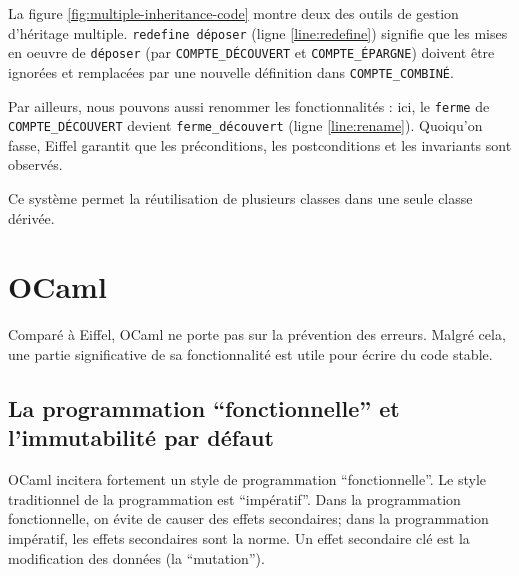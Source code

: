\documentclass[french]{report}
\begin{document}
La figure \ref{fig:multiple-inheritance-code} montre deux des outils de gestion d'héritage multiple. \texttt{redefine déposer} (ligne \ref{line:redefine}) signifie que les mises en oeuvre de \texttt{déposer} (par \texttt{COMPTE\_DÉCOUVERT} et \texttt{COMPTE\_ÉPARGNE}) doivent être ignorées et remplacées par une nouvelle définition dans \texttt{COMPTE\_COMBINÉ}.

Par ailleurs, nous pouvons aussi renommer les fonctionnalités : ici, le \texttt{ferme} de \texttt{COMPTE\_DÉCOUVERT} devient \texttt{ferme\_découvert} (ligne \ref{line:rename}). Quoiqu'on fasse, Eiffel garantit que les préconditions, les postconditions et les invariants sont observés.

Ce système permet la réutilisation de plusieurs classes dans une seule classe dérivée. %

\chapter{OCaml}

Comparé à Eiffel, OCaml ne porte pas sur la prévention des erreurs. Malgré cela, une partie significative de sa fonctionnalité est utile pour écrire du code stable.

\section{La programmation \enquote{fonctionnelle} et l'immutabilité par défaut}

OCaml incitera fortement un style de programmation \enquote{fonctionnelle}. Le style traditionnel de la programmation est \enquote{impératif}. Dans la programmation fonctionnelle, on évite de causer des effets secondaires; dans la programmation impératif, les effets secondaires sont la norme. Un effet secondaire clé est la modification des données (la \enquote{mutation}).
\end{document}
